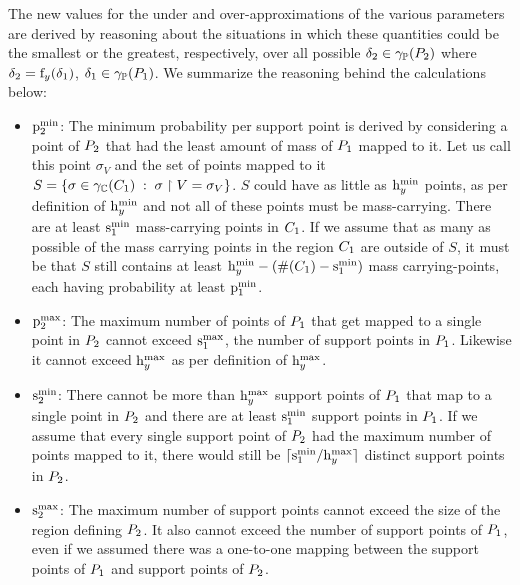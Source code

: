 The new values for the under and over-approximations of the various
parameters are derived by reasoning about the situations
in which these quantities could be the smallest or the greatest,
respectively, over all possible $ \delta_2 \in \gamma_{\mathbb{P}}(P_{2}) $ where
$ \delta_2 = \mathrm{f}_{y}(\delta_1) $, $ \delta_1 \in \gamma_{\mathbb{P}}(P_{1})
$. We summarize the reasoning behind the calculations below:
\begin{itemize}
\item{} $ \mathrm{p}^\mathrm{min}_{2} $: The minimum probability per support point is
  derived by considering a point of $ P_{2} $ that had the least
  amount of mass of $ P_{1} $ mapped to it. Let us call this point $
  \sigma_V $ and the set of points mapped to it $ S = \left\{ \sigma
      \in \gamma_{\mathbb{C}}(C_{1}) \;:\; \sigma \upharpoonright V = \sigma_V \right\}$.
    $ S $ could have as little as $ \mathrm{h}^\mathrm{min}_{y} $ points, as
    per definition of $ \mathrm{h}^\mathrm{min}_{y} $ and not all of these points must be
    mass-carrying. There are at least $ \mathrm{s}^\mathrm{min}_{1} $ mass-carrying
    points in $ C_{1} $. If we assume that as many as possible
    of the mass carrying points in the region $ C_{1} $ are
    outside of $ S $, it must be that $ S $ still contains at least
    $\mathrm{h}^\mathrm{min}_{y}-(\#(C_1) - \mathrm{s}^\mathrm{min}_{1})$ mass carrying-points, each
    having probability at least $ \mathrm{p}^\mathrm{min}_{1} $.
\item{} $ \mathrm{p}^\mathrm{max}_{2} $: The maximum number of points of $ P_{1} $ that
  get mapped to a single point in $ P_{2} $ cannot exceed $ \mathrm{s}^\mathrm{max}_{1}
  $, the number of support points in $ P_{1} $. Likewise it cannot
  exceed $ \mathrm{h}^\mathrm{max}_{y} $ as per definition of $ \mathrm{h}^\mathrm{max}_{y} $.
\item{} $ \mathrm{s}^\mathrm{min}_{2} $: There cannot be more than $ \mathrm{h}^\mathrm{max}_{y} $ support
  points of $ P_{1} $ that map to a single point in $ P_{2} $ and
  there are at least $ \mathrm{s}^\mathrm{min}_{1} $ support points in $ P_{1} $. If we
  assume that every single support point of $ P_{2} $ had the maximum
  number of points mapped to it, there would still be $ \lceil \mathrm{s}^\mathrm{min}_{1}
    / \mathrm{h}^\mathrm{max}_{y} \rceil $ distinct support points in $ P_{2} $.
\item{} $ \mathrm{s}^\mathrm{max}_{2} $: The maximum number of support points cannot
  exceed the size of the region defining $ P_{2} $. It also cannot
  exceed the number of support points of $ P_{1} $, even if we
  assumed there was a one-to-one mapping between the support points of
  $ P_{1} $ and support points of $ P_{2} $.
\end{itemize}



